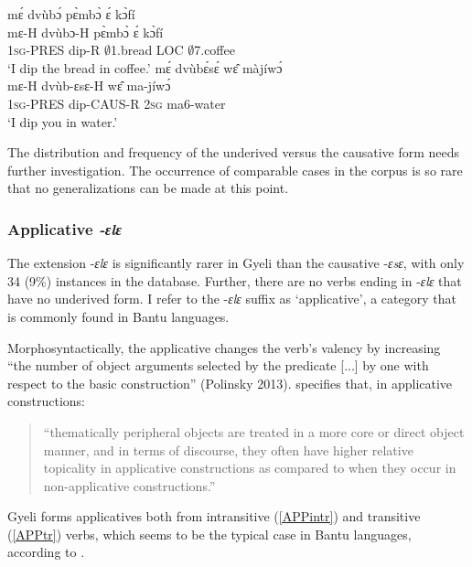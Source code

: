 \begin{exe}
\ex\label{causative}
\begin{xlist}
\ex \label{causative1}
  \glll  mɛ́ dvùbɔ́ pɛ̀mbɔ̀ ɛ́ kɔ̀fí \\
	mɛ-H dvùbɔ-H pɛ̀mbɔ̀ ɛ́ kɔ̀fí \\
              1\textsc{sg}-PRES dip-R $\emptyset$1.bread LOC $\emptyset$7.coffee \\
    \trans `I dip the bread in coffee.'
\ex\label{causative2}
 \glll  mɛ́ dvùbɛ́sɛ́ wɛ̂ màjíwɔ́ \\
	mɛ-H dvùb-ɛsɛ-H wɛ̂ ma-jíwɔ́ \\
         1\textsc{sg}-PRES dip-CAUS-R 2\textsc{sg} ma6-water  \\
    \trans `I dip you in water.'
\end{xlist}
\end{exe}

The distribution and frequency of the underived versus the causative form needs further investigation. The occurrence of comparable cases in the corpus is so rare that no generalizations can be made at this point.


\subsubsection{Applicative \textit{-ɛlɛ}}
\label{secLAPP}


The extension -{\itshape ɛlɛ}  is significantly rarer in Gyeli than the causative -{\itshape ɛsɛ}, with only 34 (9\%) instances in the database. Further, there are no verbs ending in -{\itshape ɛlɛ} that have no underived form. I refer to the -{\itshape ɛlɛ} suffix as `applicative', a category that is commonly found in Bantu languages.

Morphosyntactically, the applicative changes the verb's valency by increasing ``the number of object arguments selected by the predicate [...] by one with respect to the basic construction'' (Polinsky 2013). \citet[278]{peterson97} specifies that, in applicative constructions:
\begin{quote} ``thematically peripheral objects are treated in a more core or direct object manner, and in terms of discourse, they often have higher relative topicality in applicative constructions as compared to when they occur in non-applicative constructions.'' \end{quote}

\noindent Gyeli forms applicatives both from intransitive (\ref{APPintr}) and transitive (\ref{APPtr}) verbs, which seems to be the typical case in Bantu languages, according to \citet{polinsky2013}. 

